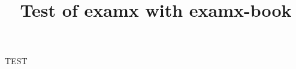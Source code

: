 \documentclass[book]{examx}
\title{Test of examx with examx-book}
\begin{document}
TEST
\end{document}

